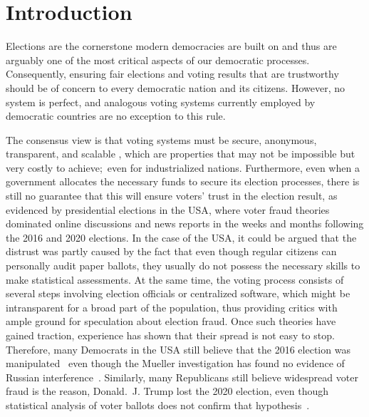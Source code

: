 \chapter{Introduction}\label{ch:intro}

Elections are the cornerstone modern democracies are built on and thus are arguably one of the most critical aspects of our democratic processes.
Consequently, ensuring fair elections and voting results that are trustworthy should be of concern to every democratic nation and its citizens.
However, no system is perfect, and analogous voting systems currently employed by democratic countries are no exception to this rule.

The consensus view is that voting systems must be secure, anonymous, transparent, and scalable
\autocites{lowry_desirable_2009}[5]{agora_agora_nodate}[9-11]{jafar_blockchain_2021},
which are properties that may not be impossible but very costly to achieve;\ even for industrialized nations.
Furthermore, even when a government allocates the necessary funds to secure its election processes, there is still no
guarantee that this will ensure voters’ trust in the election result, as evidenced by presidential elections in the \Gls{USA}, where voter fraud theories dominated online discussions and news reports in the weeks and months following the 2016 and 2020 elections.
In the case of the \Gls{USA}, it could be argued that the distrust was partly caused by the fact that even though regular citizens can personally audit paper ballots, they usually do not possess the necessary skills to make statistical assessments.
At the same time, the voting process consists of several steps involving election officials or centralized software, which might be intransparent for a broad part of the population, thus providing critics with ample ground for speculation about election fraud.
Once such theories have gained traction, experience has shown that their spread is not easy to stop.
Therefore, many Democrats in the \Gls{USA} still believe that the 2016 election was manipulated~\autocite{sinclair_its_2018}
even though the Mueller investigation has found no evidence of Russian interference~\autocite{mueller_report_2019}.
Similarly, many Republicans still believe widespread voter fraud is the reason, Donald.\ J. Trump lost the 2020 election, even though statistical analysis of voter ballots does not confirm that hypothesis~\autocite{eggers_no_2021}.

